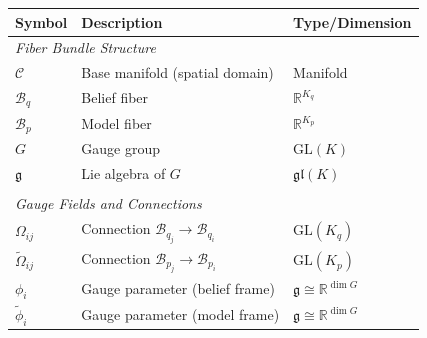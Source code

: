 \documentclass[twoside,11pt]{article}
\begin{document}
\begin{table}[h]
\centering
\renewcommand{\arraystretch}{1.15}
\setlength{\tabcolsep}{6pt}
\begin{tabularx}{\textwidth}{l>{\raggedright\arraybackslash}Xl}
\hline
\textbf{Symbol} & \textbf{Description} & \textbf{Type/Dimension} \\
\hline
\multicolumn{3}{l}{\textit{Fiber Bundle Structure}} \\
$\mathcal{C}$ & Base manifold (spatial domain) & Manifold \\
$\mathcal{B}_q$ & Belief fiber & $\mathbb{R}^{K_q}$ \\
$\mathcal{B}_p$ & Model fiber  & $\mathbb{R}^{K_p}$ \\
$G$ & Gauge group & $\mathrm{GL}(K)$ \\
$\mathfrak{g}$ & Lie algebra of $G$ & $\mathfrak{gl}(K)$ \\
\\
\multicolumn{3}{l}{\textit{Gauge Fields and Connections}} \\
$\Omega_{ij}$ & Connection $\mathcal{B}_{q_j} \to \mathcal{B}_{q_i}$ & $\mathrm{GL}(K_q)$ \\
$\tilde\Omega_{ij}$ & Connection $\mathcal{B}_{p_j} \to \mathcal{B}_{p_i}$ & $\mathrm{GL}(K_p)$ \\
$\phi_i$ & Gauge parameter (belief frame) & $\mathfrak{g}\!\cong\!\mathbb{R}^{\dim G}$ \\
$\tilde{\phi}_i$ & Gauge parameter (model frame) & $\mathfrak{g}\!\cong\!\mathbb{R}^{\dim G}$ \\


\end{tabularx}
\end{table}
\end{document}
